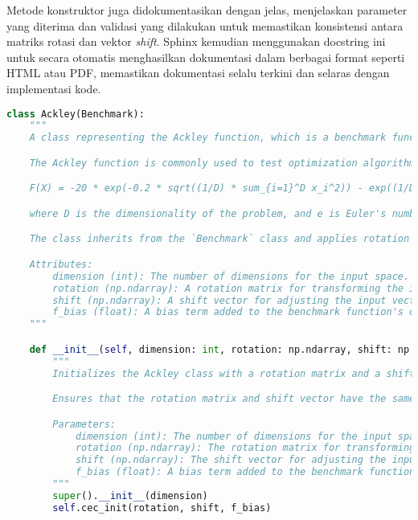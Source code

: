 Metode konstruktor juga didokumentasikan dengan jelas, menjelaskan parameter yang diterima dan validasi yang dilakukan untuk memastikan konsistensi antara matriks rotasi dan vektor \textit{shift}. Sphinx kemudian menggunakan docstring ini untuk secara otomatis menghasilkan dokumentasi dalam berbagai format seperti HTML atau PDF, memastikan dokumentasi selalu terkini dan selaras dengan implementasi kode.
\begin{lstlisting}[language=Python, caption=Dokumentasi menggunakan docstring pada fungsi Ackley, label=lst:docstring]
class Ackley(Benchmark):
    """
    A class representing the Ackley function, which is a benchmark function for optimization.

    The Ackley function is commonly used to test optimization algorithms due to its complex and multi-modal nature. The function is defined as:

    F(X) = -20 * exp(-0.2 * sqrt((1/D) * sum_{i=1}^D x_i^2)) - exp((1/D) * sum_{i=1}^D cos(2 * pi * x_i)) + 20 + e,

    where D is the dimensionality of the problem, and e is Euler's number (~2.71828).

    The class inherits from the `Benchmark` class and applies rotation and shift transformations to the input vector before evaluating the function.

    Attributes:
        dimension (int): The number of dimensions for the input space. Must be a positive integer.
        rotation (np.ndarray): A rotation matrix for transforming the input vector.
        shift (np.ndarray): A shift vector for adjusting the input vector.
        f_bias (float): A bias term added to the benchmark function's output. Defaults to 0.
    """

    def __init__(self, dimension: int, rotation: np.ndarray, shift: np.ndarray, f_bias: float = 0) -> None:
        """
        Initializes the Ackley class with a rotation matrix and a shift vector.

        Ensures that the rotation matrix and shift vector have the same length. If their lengths do not match, a ValueError is raised.

        Parameters:
            dimension (int): The number of dimensions for the input space. Must be a positive integer.
            rotation (np.ndarray): The rotation matrix for transforming the input vector.
            shift (np.ndarray): The shift vector for adjusting the input vector.
            f_bias (float): A bias term added to the benchmark function's output. Defaults to 0.
        """
        super().__init__(dimension)
        self.cec_init(rotation, shift, f_bias)
\end{lstlisting}

